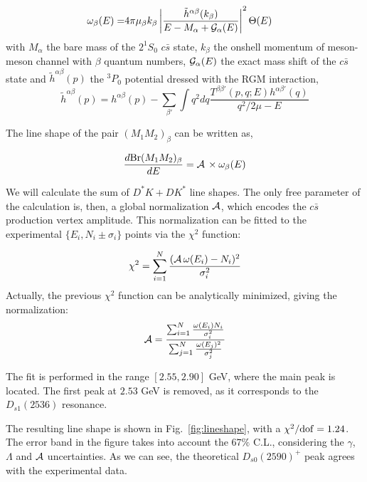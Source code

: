 \documentclass[aps, prd, floatfix, twocolumn, superscriptaddress, nofootinbib]{revtex4-1}
\begin{document}
\begin{align}
 \omega_\beta(E) =&  4\pi \mu_\beta k_\beta \left|\frac{\tilde{h}^{\alpha\beta}(k_\beta)}{E-M_\alpha+{\cal G}_{\alpha}(E)}\right|^2 \Theta(E)
\end{align}
with $M_\alpha$ the bare mass of the $2^1S_0$ $c\bar s$ state, $k_\beta$ the onshell momentum of meson-meson channel with $\beta$ quantum numbers, ${\cal G}_{\alpha}(E)$ the exact mass shift of the $c\bar s$ state and $\tilde{h}^{\alpha\beta}(p)$ the $^3P_0$ potential dressed with the RGM interaction,
\begin{equation}\label{ec:tqhmatrix}
 \tilde{h}^{\alpha\beta}(p)=h^{\alpha\beta}(p)-\sum_{\beta'}\int q^2dq \frac{T^{\beta\beta'}(p,q;E)h^{\alpha\beta'}(q)}{q^2/2\mu -E}
\end{equation}

The line shape of the pair $(M_1M_2)_\beta$ can be written as,

\begin{equation}\label{eq:lineshape}
 \frac{d{\rm Br}(M_1M_2)_\beta}{dE} = {\cal A}\,\times \omega_\beta(E)
\end{equation}

We will calculate the sum of $D^*K+DK^*$ line shapes. The only free parameter of the calculation is, then, a global normalization ${\cal A}$, which encodes the $c\bar s$ production vertex amplitude. This normalization can be fitted to the experimental $\{E_i,N_i\pm\sigma_i\}$ points via the $\chi^2$ function:

\begin{equation}
 \chi^2=\sum_{i=1}^N\frac{({\cal A}\, \omega(E_i)-N_i)^2}{\sigma_i^2}
\end{equation}
%
Actually, the previous $\chi^2$ function can be analytically minimized, giving the normalization:
\begin{equation}
 {\cal A}= \frac{\sum_{i=1}^N \frac{\omega(E_i)N_i}{\sigma_i^2}}{\sum_{j=1}^N \frac{\omega(E_j)^2}{\sigma_j^2}}
\end{equation}

The fit is performed in the range $[2.55,2.90]$ GeV, where the main peak is located. The first peak at $2.53$ GeV is removed, as it corresponds to the $D_{s1}(2536)$ resonance.

The resulting line shape is shown in Fig.~\ref{fig:lineshape}, with a $\chi^2/{\rm dof}=1.24$. The error band in the figure takes into account the $67\%$ C.L., considering the $\gamma$, $\Lambda$ and ${\cal A}$ uncertainties. As we can see, the theoretical $D_{s0}(2590)^+$ peak agrees with the experimental data.
 
\end{document}
